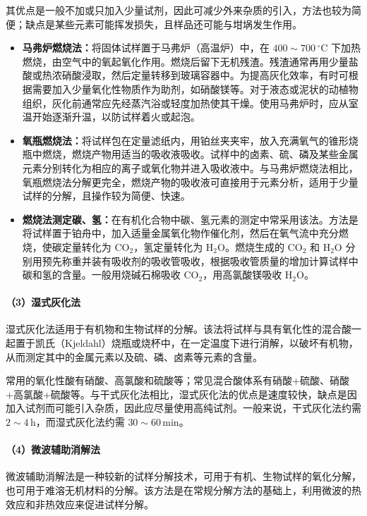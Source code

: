 \documentclass[12pt,a4paper]{article}
\numberwithin{equation}{section}
\begin{document}
其优点是一般不加或只加入少量试剂，因此可减少外来杂质的引入，方法也较为简便；缺点是某些元素可能挥发损失，且样品还可能与坩埚发生作用。

\begin{itemize}
    \item \textbf{马弗炉燃烧法：}将固体试样置于马弗炉（高温炉）中，在 \(400\sim700\,^\circ\mathrm{C}\) 下加热燃烧，由空气中的氧起氧化作用。燃烧后留下无机残渣。残渣通常再用少量盐酸或热浓硝酸浸取，然后定量转移到玻璃容器中。为提高灰化效率，有时可根据需要加入少量氧化性物质作为助剂，如硝酸镁等。对于液态或泥状的动植物组织，灰化前通常应先经蒸汽浴或轻度加热使其干燥。使用马弗炉时，应从室温开始逐渐升温，以防试样着火或起泡。

    \item \textbf{氧瓶燃烧法：}将试样包在定量滤纸内，用铂丝夹夹牢，放入充满氧气的锥形烧瓶中燃烧，燃烧产物用适当的吸收液吸收。试样中的卤素、硫、磷及某些金属元素分别转化为相应的离子或氧化物并进入吸收液中。与马弗炉燃烧法相比，氧瓶燃烧法分解更完全，燃烧产物的吸收液可直接用于元素分析，适用于少量试样的分解，且操作较为简便、快速。

    \item \textbf{燃烧法测定碳、氢：}在有机化合物中碳、氢元素的测定中常采用该法。方法是将试样置于铂舟中，加入适量金属氧化物作催化剂，然后在氧气流中充分燃烧，使碳定量转化为 \(\mathrm{CO_2}\)，氢定量转化为 \(\mathrm{H_2O}\)。燃烧生成的 \(\mathrm{CO_2}\) 和 \(\mathrm{H_2O}\) 分别用预先称重并装有吸收剂的吸收管吸收，根据吸收管质量的增加计算试样中碳和氢的含量。一般用烧碱石棉吸收 \(\mathrm{CO_2}\)，用高氯酸镁吸收 \(\mathrm{H_2O}\)。
\end{itemize}

\paragraph{（3）湿式灰化法}
湿式灰化法适用于有机物和生物试样的分解。该法将试样与具有氧化性的混合酸一起置于凯氏（Kjeldahl）烧瓶或烧杯中，在一定温度下进行消解，以破坏有机物，从而测定其中的金属元素以及硫、磷、卤素等元素的含量。

常用的氧化性酸有硝酸、高氯酸和硫酸等；常见混合酸体系有硝酸+\allowbreak 硫酸、硝酸+\allowbreak 高氯酸+\allowbreak 硫酸等。与干式灰化法相比，湿式灰化法的优点是速度较快，缺点是因加入试剂而可能引入杂质，因此应尽量使用高纯试剂。一般来说，干式灰化法约需 \(2\sim4\,\mathrm{h}\)，而湿式灰化法约需 \(30\sim60\,\mathrm{min}\)。

\paragraph{（4）微波辅助消解法}
微波辅助消解法是一种较新的试样分解技术，可用于有机、生物试样的氧化分解，也可用于难溶无机材料的分解。该方法是在常规分解方法的基础上，利用微波的热效应和非热效应来促进试样分解。
\end{document}
